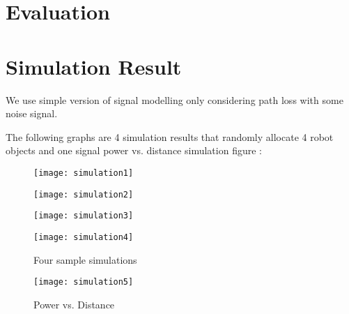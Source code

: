 \section{Evaluation}
\label{sec:evaluation}
\section{Simulation Result}
\indent 
	We use simple version of signal modelling only considering path loss with some noise signal. 
\par 
	The following graphs are 4 simulation results that randomly allocate 4 robot objects and one signal power vs. distance simulation figure :\\
 
\begin{figure}[h]
\begin{minipage}[h]{0.4\linewidth}
	\centering
	\texttt{[image: simulation1]}
	\end{minipage}
	
	\begin{minipage}[h]{0.4\linewidth}
	\centering
	\texttt{[image: simulation2]}
	\end{minipage}

	\begin{minipage}[h]{0.4\linewidth}
	\centering
	\texttt{[image: simulation3]}
	\end{minipage}
	
	\begin{minipage}[h]{0.4\linewidth}
	\centering
	\texttt{[image: simulation4]}
	\end{minipage}

\caption{Four sample simulations}

\begin{minipage}[h]{\linewidth}
	\centering
	\texttt{[image: simulation5]}
	\end{minipage}
	\caption{Power vs. Distance}
	
\label{fig:image2}
\end{figure}

